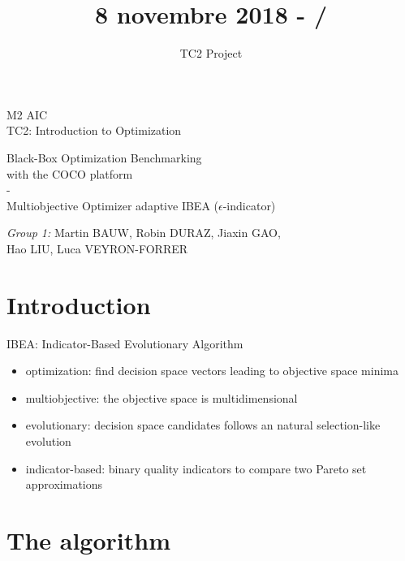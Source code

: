 \documentclass{beamer}
\title{8 novembre 2018 - \insertframenumber/\inserttotalframenumber}
\author{TC2 Project}
\begin{document}
\begin{frame}
\begin{center}
{ M2 AIC\\\footnotesize TC2: Introduction to Optimization}
\vfill
{\large
\begin{framed}
Black-Box Optimization Benchmarking\\ with the COCO platform\\ - \\Multiobjective Optimizer adaptive IBEA ($\epsilon$-indicator) 
\end{framed}
}
\vfill

{\footnotesize \vfill \textit{Group 1:} Martin BAUW, Robin DURAZ, Jiaxin GAO,\\ Hao LIU, Luca VEYRON-FORRER}
\end{center}
\end{frame}

\begin{frame}
\tableofcontents
\end{frame}

\section{Introduction}
\begin{frame}
IBEA: Indicator-Based Evolutionary Algorithm
\begin{itemize}
\item optimization: find decision space vectors leading to objective space minima
\item multiobjective: the objective space is multidimensional
\item evolutionary: decision space candidates follows an natural selection-like evolution
\item indicator-based: binary quality indicators to compare two Pareto set approximations
\end{itemize}
\end{frame}


\section{The algorithm}
\end{document}
